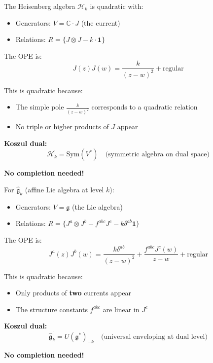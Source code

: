 \begin{example}\label{ex:heisenberg-quadratic}
The Heisenberg algebra $\mathcal{H}_k$ is quadratic with:
\begin{itemize}
\item Generators: $V = \mathbb{C} \cdot J$ (the current)
\item Relations: $R = \{J \otimes J - k \cdot \mathbf{1}\}$
\end{itemize}

The OPE is:
$$J(z)J(w) = \frac{k}{(z-w)^2} + \text{regular}$$

This is quadratic because:
\begin{itemize}
\item The simple pole $\frac{k}{(z-w)^2}$ corresponds to a quadratic relation
\item No triple or higher products of $J$ appear
\end{itemize}

\textbf{Koszul dual:}
$$\mathcal{H}_k^! = \text{Sym}(V^*) \quad \text{(symmetric algebra on dual space)}$$

\textbf{No completion needed!}
\end{example}

\begin{example}\label{ex:km-quadratic}
For $\widehat{\mathfrak{g}}_k$ (affine Lie algebra at level $k$):
\begin{itemize}
\item Generators: $V = \mathfrak{g}$ (the Lie algebra)
\item Relations: $R = \{J^a \otimes J^b - f^{abc}J^c - k \delta^{ab} \mathbf{1}\}$
\end{itemize}

The OPE is:
$$J^a(z)J^b(w) = \frac{k \delta^{ab}}{(z-w)^2} + \frac{f^{abc}J^c(w)}{z-w} + \text{regular}$$

This is quadratic because:
\begin{itemize}
\item Only products of \textbf{two} currents appear
\item The structure constants $f^{abc}$ are linear in $J^c$
\end{itemize}

\textbf{Koszul dual:}
$$\widehat{\mathfrak{g}}_k^! = U(\mathfrak{g}^*)_{-k} 
\quad \text{(universal enveloping at dual level)}$$

\textbf{No completion needed!}
\end{example}

